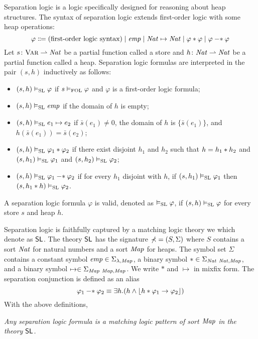 \documentclass{amsart}
\begin{document}
Separation logic is a logic specifically designed for reasoning about
heap structures.
The syntax of separation logic extends first-order logic with
some heap operations:
\begin{equation*}
\varphi \Coloneqq
\text{(first-order logic syntax)}
\mid \emp \mid \Nat \mapsto \Nat \mid \varphi \merge \varphi
\mid \varphi \simp \varphi
\end{equation*}
Let $s \colon \Var \pto \Nat$ be a partial function called a store
and $h \colon \Nat \pto \Nat$ be a partial function called a heap.
Separation logic formulas are interpreted in the pair $(s,h)$
inductively as follows:
\begin{itemize}
\item $(s,h) \vDash_{\SL} \varphi$
      if $s \vDash_{\FOL} \varphi$ and $\varphi$ is a first-order logic formula;
\item $(s,h) \vDash_\SL \emp$ if the domain of $h$ is empty;
\item $(s,h) \vDash_\SL e_1 \mapsto e_2$
      if $\bar{s}(e_1) \neq 0$, the domain of $h$ is $\{ \bar{s}(e_1) \}$, and 
      $h( \bar{s}(e_1) ) = \bar{s}(e_2)$;
\item $(s,h) \vDash_\SL \varphi_1 \merge \varphi_2$ if
      there exist disjoint $h_1$ and $h_2$ such that
      $h = h_1 \merge h_2$ and
      $(s,h_1) \vDash_\SL \varphi_1$
      and $(s, h_2) \vDash_\SL \varphi_2$;
\item $(s,h) \vDash_\SL \varphi_1 \simp \varphi_2$ if
      for every $h_1$ disjoint with $h$,
      if $(s,h_1) \vDash_\SL \varphi_1$ then
      $(s,h_1 \merge h) \vDash_\SL \varphi_2$.
\end{itemize}
A separation logic formula $\varphi$ is valid,
denoted as $\vDash_\SL \varphi$,
if $(s,h)\vDash_\SL \varphi$ for every store $s$ and heap $h$.

Separation logic is faithfully captured by a matching logic theory
we which denote as $\MLSL$.
The theory $\MLSL$ has the signature
$\sig = (S, \Sigma)$ 
where $S$ contains a sort $\Nat$ for natural numbers and
a sort $\Map$ for heaps. 
The symbol set $\Sigma$ contains
a constant symbol $\emp \in \Sigma_{\lambda,\Map}$,
a binary symbol $* \in \Sigma_{\Nat\ \Nat,\Map}$,
and a binary symbol $\mapsto \in \Sigma_{\Map\ \Map,\Map}$.
We write $*$ and $\mapsto$ in mixfix form.
The separation conjunction is defined as an alias
\begin{equation*}
\varphi_1 \simp \varphi_2 \equiv
\exists h . ( h \wedge \floor{ h \merge \varphi_1 \imp \varphi_2 } )
\end{equation*}
With the above definitions,
\begin{center}
\em Any separation logic formula is a matching logic pattern of sort $\Map$
in the theory $\MLSL$.
\end{center}
\end{document}
